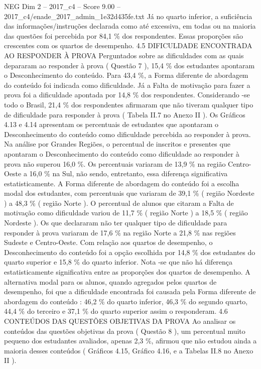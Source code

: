 \begin{textsample}{NEG Dim 2 – 2017\_c4 – Score 9.00 – 2017\_c4/enade\_2017\_admin\_1e32d435fe.txt}
Já no quarto inferior, a suficiência das informações/instruções declarada como até excessiva, em todas ou na maioria das questões foi percebida por 84,1 \% dos respondentes.
Essas proporções são crescentes com os quartos de desempenho. 4.5 DIFICULDADE ENCONTRADA AO RESPONDER À PROVA Perguntados sobre as dificuldades com as quais depararam ao responder à prova ( Questão 7 ), 15,4 \% dos estudantes apontaram o Desconhecimento do conteúdo.
Para 43,4 \%, a Forma diferente de abordagem do conteúdo foi indicada como dificuldade.
Já a Falta de motivação para fazer a prova foi a dificuldade apontada por 14,8 \% dos respondentes.
Considerando -se todo o Brasil, 21,4 \% dos respondentes afirmaram que não tiveram qualquer tipo de dificuldade para responder à prova ( Tabela II.7 no Anexo II ).
Os Gráficos 4.13 e 4.14 apresentam os percentuais de estudantes que apontaram o Desconhecimento do conteúdo como dificuldade percebida ao responder à prova.
Na análise por Grandes Regiões, o percentual de inscritos e presentes que apontaram o Desconhecimento do conteúdo como dificuldade ao responder à prova não superou 16,0 \%.
Os percentuais variaram de 13,9 \% na região Centro-Oeste a 16,0 \% na Sul, não sendo, entretanto, essa diferença significativa estatisticamente.
A Forma diferente de abordagem do conteúdo foi a escolha modal dos estudantes, com percentuais que variaram de 39,1 \% ( região Nordeste ) a 48,3 \% ( região Norte ).
O percentual de alunos que citaram a Falta de motivação como dificuldade variou de 11,7 \% ( região Norte ) a 18,5 \% ( região Nordeste ).
Os que declararam não ter qualquer tipo de dificuldade para responder à prova variaram de 17,6 \% na região Norte a 21,8 \% nas regiões Sudeste e Centro-Oeste.
Com relação aos quartos de desempenho, o Desconhecimento do conteúdo foi a opção escolhida por 14,8 \% dos estudantes do quarto superior e 15,8 \% do quarto inferior.
Nota -se que não há diferença estatisticamente significativa entre as proporções dos quartos de desempenho.
A alternativa modal para os alunos, quando agregados pelos quartos de desempenho, foi que a dificuldade encontrada foi causada pela Forma diferente de abordagem do conteúdo : 46,2 \% do quarto inferior, 46,3 \% do segundo quarto, 44,4 \% do terceiro e 37,1 \% do quarto superior assim o responderam. 4.6 CONTEÚDOS DAS QUESTÕES OBJETIVAS DA PROVA Ao analisar os conteúdos das questões objetivas da prova ( Questão 8 ), um percentual muito pequeno dos estudantes avaliados, apenas 2,3 \%, afirmou que não estudou ainda a maioria desses conteúdos ( Gráficos 4.15, Gráfico 4.16, e a Tabelas II.8 no Anexo II ).

\end{textsample}
